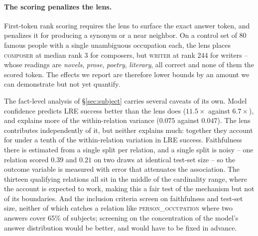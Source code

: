 \paragraph{The scoring penalizes the lens.} First-token rank scoring
requires the lens to surface the exact answer token, and penalizes it for
producing a synonym or a near neighbor. On a control set of 80 famous
people with a single unambiguous occupation each, the lens places
\textsc{composer} at median rank 3 for composers, but \textsc{writer} at
rank 244 for writers -- whose readings are \emph{novels}, \emph{prose},
\emph{poetry}, \emph{literary}, all correct and none of them the scored
token. The effects we report are therefore lower bounds by an amount we
can demonstrate but not yet quantify.


The fact-level analysis of \S\ref{sec:subject} carries several
caveats of its own. Model confidence predicts LRE success better than
the lens does ($11.5\times$ against $6.7\times$), and explains more of the
within-relation variance ($0.075$ against $0.047$). The lens contributes
independently of it, but neither explains much: together they account for
under a tenth of the within-relation variation in LRE success. Faithfulness there is estimated from a single split per
relation, and a single split is noisy -- one relation scored $0.39$ and
$0.21$ on two draws at identical test-set size -- so the outcome variable
is measured with error that attenuates the association. The thirteen
qualifying relations all sit in the middle of the cardinality range, where
the account is expected to work, making this a fair test of the mechanism
but not of its boundaries. And the inclusion criteria screen on
faithfulness and test-set size, neither of which catches a relation like
\textsc{person\_occupation} where two answers cover 65\% of subjects;
screening on the concentration of the model's answer distribution would
be better, and would have to be fixed in advance.
